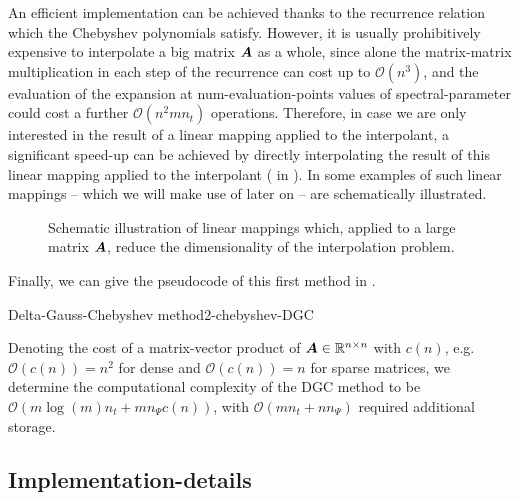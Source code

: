 An efficient implementation can be achieved thanks to the recurrence relation
 which the Chebyshev polynomials satisfy.
However, it is usually prohibitively expensive to interpolate a big matrix
$\boldsymbol{A}$ as a whole, since alone the matrix-matrix multiplication in each step
of the recurrence can cost up to $\mathcal{O}(n^3)$, and the evaluation
of the expansion at \gls{num-evaluation-points} values of \gls{spectral-parameter} could
cost a further $\mathcal{O}(n^2 m n_t)$ operations. Therefore, in case we are only interested
in the result of a linear mapping applied to the interpolant, a significant speed-up can be
achieved by directly interpolating the result of this linear mapping applied to
the interpolant ( in ).
In  some examples
of such linear mappings -- which we will make use of later on -- are schematically
illustrated.\\
\begin{figure}[ht]
    \centering
    
    \caption{Schematic illustration of linear mappings which, applied to a large
        matrix $\boldsymbol{A}$, reduce the dimensionality of the interpolation problem.}
    \label{fig:2-chebyshev-sketched-interpolation}
\end{figure}

Finally, we can give the pseudocode
of this first method in .
\begin{algo}{Delta-Gauss-Chebyshev method}{2-chebyshev-DGC}
    
\end{algo}

Denoting the cost of a matrix-vector product of $\boldsymbol{A} \in \mathbb{R}^{n \times n}$
with $c(n)$, e.g. $\mathcal{O}(c(n)) = n^2$ for dense and
$\mathcal{O}(c(n)) = n$ for sparse matrices, we determine the computational
complexity of the \gls{DGC} method to be $\mathcal{O}(m \log(m) n_t + m n_{\Psi} c(n))$,
with $\mathcal{O}(m n_t + n n_{\Psi})$ required additional storage.


\subsection{Implementation-details}
\label{subsec:2-chebyshev-implementation-details}

